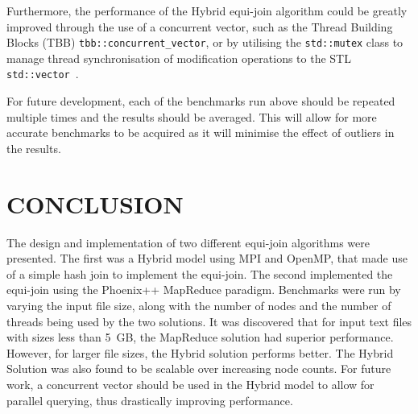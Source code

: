 \documentclass[12pt,twocolumn]{witseiepaper}
\begin{document}
Furthermore, the performance of the Hybrid equi-join algorithm could be greatly improved through the use of a concurrent vector, such as the Thread Building Blocks (TBB) \texttt{tbb::concurrent\_vector}, or by utilising the \texttt{std::mutex} class to manage thread synchronisation of modification operations to the STL \texttt{std::vector}~\cite{tbb,mutex}.

For future development, each of the benchmarks run above should be repeated multiple times and the results should be averaged. This will allow for more accurate benchmarks to be acquired as it will minimise the effect of outliers in the results.

\section{CONCLUSION}
The design and implementation of two different equi-join algorithms were presented. The first was a Hybrid model using MPI and OpenMP, that made use of a simple hash join to implement the equi-join. The second implemented the equi-join using the Phoenix++ MapReduce paradigm. Benchmarks were run by varying the input file size, along with the number of nodes and the number of threads being used by the two solutions. It was discovered that for input text files with sizes less than 5~GB, the MapReduce solution had superior performance. However, for larger file sizes, the Hybrid solution performs better. The Hybrid Solution was also found to be scalable over increasing node counts. For future work, a concurrent vector should be used in the Hybrid model to allow for parallel querying, thus drastically improving performance.


{
	{\small

}
}
\end{document}

